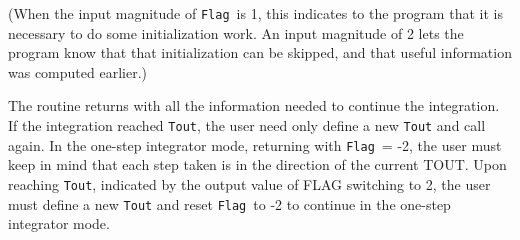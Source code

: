 \documentclass[12pt,a4paper,oneside]{report}
\newcommand{\code}[1]{\texttt{#1}}
\begin{document}
\begin{itemize}
	(When the input magnitude of \code{Flag}\ is 1, this indicates to the program
	that it is necessary to do some initialization work.  An input magnitude
	of 2 lets the program know that that initialization can be skipped,
	and that useful information was computed earlier.)
	
	The routine returns with all the information needed to continue
	the integration.  If the integration reached \code{Tout}, the user need only
	define a new \code{Tout} and call again.  In the one-step integrator
	mode, returning with \code{Flag}\ = -2, the user must keep in mind that
	each step taken is in the direction of the current TOUT.  Upon
	reaching \code{Tout}, indicated by the output value of FLAG switching to 2,
	the user must define a new \code{Tout} and reset \code{Flag}\ to -2 to continue
	in the one-step integrator mode.
	

\end{itemize}
\end{document}
